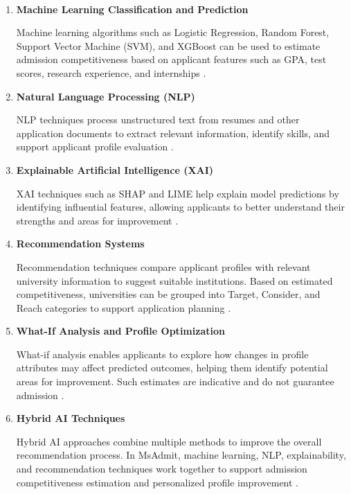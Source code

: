 \
\begin{enumerate}

    \item \textbf{Machine Learning Classification and Prediction}

    Machine learning algorithms such as Logistic Regression, Random Forest, Support Vector Machine (SVM), and XGBoost can be used to estimate admission competitiveness based on applicant features such as GPA, test scores, research experience, and internships \cite{scikit_learn,xgboost}.

    \item \textbf{Natural Language Processing (NLP)}

    NLP techniques process unstructured text from resumes and other application documents to extract relevant information, identify skills, and support applicant profile evaluation \cite{huggingface_nlp}.

    \item \textbf{Explainable Artificial Intelligence (XAI)}

    XAI techniques such as SHAP and LIME help explain model predictions by identifying influential features, allowing applicants to better understand their strengths and areas for improvement \cite{shap,lime}.

    \item \textbf{Recommendation Systems}

    Recommendation techniques compare applicant profiles with relevant university information to suggest suitable institutions. Based on estimated competitiveness, universities can be grouped into Target, Consider, and Reach categories to support application planning \cite{google_recommendation}.

    \item \textbf{What-If Analysis and Profile Optimization}

    What-if analysis enables applicants to explore how changes in profile attributes may affect predicted outcomes, helping them identify potential areas for improvement. Such estimates are indicative and do not guarantee admission \cite{what_if_tool}.

    \item \textbf{Hybrid AI Techniques}

    Hybrid AI approaches combine multiple methods to improve the overall recommendation process. In MsAdmit, machine learning, NLP, explainability, and recommendation techniques work together to support admission competitiveness estimation and personalized profile improvement \cite{hybrid_recommender}.

\end{enumerate}


